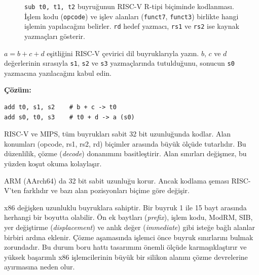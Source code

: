 \begin{figure}[H]
\caption[R-tipi buyruğun kodlanması]{\texttt{sub t0, t1, t2} buyruğunun RISC-V R-tipi biçiminde kodlanması. İşlem kodu (\texttt{opcode}) ve işlev alanları (\texttt{funct7}, \texttt{funct3}) birlikte hangi işlemin yapılacağını belirler. \texttt{rd} hedef yazmacı, \texttt{rs1} ve \texttt{rs2} ise kaynak yazmaçları gösterir.}
\label{fig:buyruk-bilesenleri}
\end{figure}

\begin{ornek}[3.1]
$a = b + c + d$ eşitliğini RISC-V çevirici dil buyruklarıyla yazın. $b$, $c$ ve $d$ değerlerinin sırasıyla \texttt{s1}, \texttt{s2} ve \texttt{s3} yazmaçlarında tutulduğunu, sonucun \texttt{s0} yazmacına yazılacağını kabul edin.

\textbf{Çözüm:}
\begin{lstlisting}[style=riscv]
add t0, s1, s2    # b + c -> t0
add s0, t0, s3    # t0 + d -> a (s0)
\end{lstlisting}
\end{ornek}

\begin{karsilastirma}
RISC-V ve MIPS, tüm buyrukları sabit 32 bit uzunluğunda kodlar. Alan konumları (opcode, rs1, rs2, rd) biçimler arasında büyük ölçüde tutarlıdır. Bu düzenlilik, çözme (\emph{decode}) donanımını basitleştirir. Alan sınırları değişmez, bu yüzden koşut okuma kolaylaşır.

ARM (AArch64) da 32 bit sabit uzunluğu korur. Ancak kodlama şeması RISC-V'ten farklıdır ve bazı alan pozisyonları biçime göre değişir.

x86 değişken uzunluklu buyruklara sahiptir. Bir buyruk 1 ile 15 bayt arasında herhangi bir boyutta olabilir. Ön ek baytları (\emph{prefix}), işlem kodu, ModRM, SIB, yer değiştirme (\emph{displacement}) ve anlık değer (\emph{immediate}) gibi isteğe bağlı alanlar birbiri ardına eklenir. Çözme aşamasında işlemci önce buyruk sınırlarını bulmak zorundadır. Bu durum boru hattı tasarımını önemli ölçüde karmaşıklaştırır ve yüksek başarımlı x86 işlemcilerinin büyük bir silikon alanını çözme devrelerine ayırmasına neden olur.
\end{karsilastirma}

